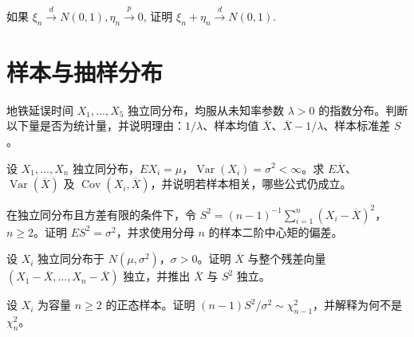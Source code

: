 \begin{exercise}[小扰动不改变分布极限]\label{q:A7.25}
如果 $\xi_n\xrightarrow{d}N(0,1),\eta_n\xrightarrow{p}0$, 证明 $\xi_n+\eta_n\xrightarrow{d}N(0,1)$.\par{}\end{exercise}

\clearpage\section{样本与抽样分布}

\begin{exercise}[统计量与未知参数]\label{q:M-F-C4}
地铁延误时间 $X_1,\ldots,X_5$ 独立同分布，均服从未知率参数 $\lambda>0$ 的指数分布。判断以下量是否为统计量，并说明理由：$1/\lambda$、样本均值 $\overline X$、$\overline X-1/\lambda$、样本标准差 $S$。\par{}\end{exercise}

\begin{exercise}[样本均值的均值与方差]\label{q:B8.1}
设 $X_1,\ldots,X_n$ 独立同分布，$EX_i=\mu$，$\operatorname{Var}(X_i)=\sigma^2<\infty$。求 $E\overline X$、$\operatorname{Var}(\overline X)$ 及 $\operatorname{Cov}(X_i,\overline X)$，并说明若样本相关，哪些公式仍成立。\par{}\end{exercise}

\begin{exercise}[样本方差的无偏性]\label{q:B8.2}
在独立同分布且方差有限的条件下，令 $S^2=(n-1)^{-1}\sum_{i=1}^n(X_i-\overline X)^2$，$n\ge2$。证明 $ES^2=\sigma^2$，并求使用分母 $n$ 的样本二阶中心矩的偏差。\par{}\end{exercise}

\begin{exercise}[正态样本均值和残差的独立性]\label{q:B8.3}
设 $X_i$ 独立同分布于 $N(\mu,\sigma^2)$，$\sigma>0$。证明 $\overline X$ 与整个残差向量 $(X_1-\overline X,\ldots,X_n-\overline X)$ 独立，并推出 $\overline X$ 与 $S^2$ 独立。\par{}\end{exercise}

\begin{exercise}[卡方分布及自由度]\label{q:B8.4}
设 $X_i$ 为容量 $n\ge2$ 的正态样本。证明 $(n-1)S^2/\sigma^2\sim\chi^2_{n-1}$，并解释为何不是 $\chi^2_n$。\par{}\end{exercise}

